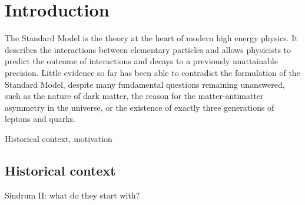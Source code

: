 \chapter{Introduction}

The Standard Model is the theory at the heart of modern high energy physics. It describes the interactions between elementary particles and allows physicists to predict the outcome of interactions and decays to a previously unattainable precision. Little evidence so far has been able to contradict the formulation of the Standard Model, despite many fundamental questions remaining unanswered, such as the nature of dark matter, the reason for the matter-antimatter asymmetry in the universe, or the existence of exactly three generations of leptons and quarks.

Historical context, motivation

\section{Historical context}
Sindrum II: what do they start with?

%
%
%
%
